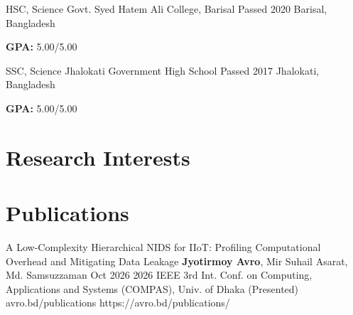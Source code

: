 \documentclass[11pt, a4paper]{article}
\begin{document}
\cvEducation
    {HSC, Science}
    {Govt. Syed Hatem Ali College, Barisal}
    {Passed 2020}
    {Barisal, Bangladesh}
    {
        \item \textbf{GPA:} 5.00/5.00
    }

\cvEducation
    {SSC, Science}
    {Jhalokati Government High School}
    {Passed 2017}
    {Jhalokati, Bangladesh}
    {
        \item \textbf{GPA:} 5.00/5.00
    }

\section{Research Interests}

\section{Publications}
\cvPublication
    {A Low-Complexity Hierarchical NIDS for IIoT: Profiling Computational Overhead and Mitigating Data Leakage}
    {\textbf{Jyotirmoy Avro}, Mir Suhail Asarat, Md. Samsuzzaman}
    {Oct 2026}
    {2026 IEEE 3rd Int. Conf. on Computing, Applications and Systems (COMPAS), Univ. of Dhaka (Presented)}
    {avro.bd/publications}
    {https://avro.bd/publications/}

\end{document}
